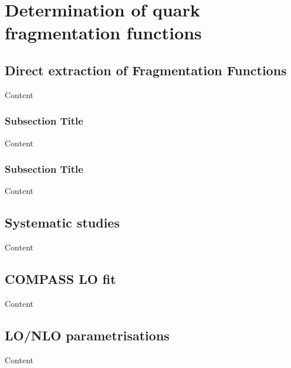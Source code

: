 
\chapter{Determination of quark fragmentation functions} %

\label{ch:FF} %


\section{Direct extraction of Fragmentation Functions}

Content


\subsection{Subsection Title}

Content


\subsection{Subsection Title}

Content


\section{Systematic studies}

Content


\section{COMPASS LO fit}

Content


\section{LO/NLO parametrisations}

Content
